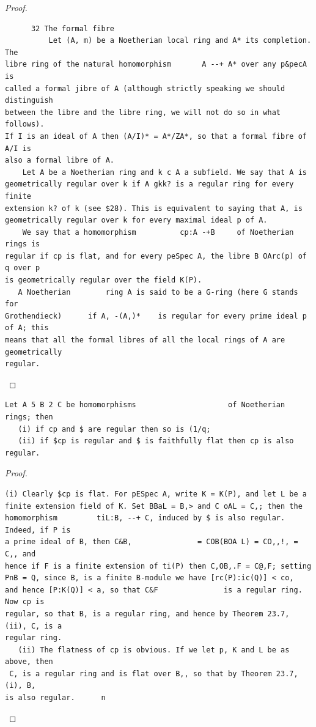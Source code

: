 \begin{proof}
\begin{verbatim}
      32 The formal fibre
          Let (A, m) be a Noetherian local ring and A* its completion. The
libre ring of the natural homomorphism       A --+ A* over any p&pecA is
called a formal jibre of A (although strictly speaking we should distinguish
between the libre and the libre ring, we will not do so in what follows).
If I is an ideal of A then (A/I)* = A*/ZA*, so that a formal fibre of A/I is
also a formal libre of A.
    Let A be a Noetherian ring and k c A a subfield. We say that A is
geometrically regular over k if A gkk? is a regular ring for every finite
extension k? of k (see $28). This is equivalent to saying that A, is
geometrically regular over k for every maximal ideal p of A.
    We say that a homomorphism          cp:A -+B     of Noetherian    rings is
regular if cp is flat, and for every peSpec A, the libre B OArc(p) of q over p
is geometrically regular over the field K(P).
   A Noetherian        ring A is said to be a G-ring (here G stands for
Grothendieck)      if A, -(A,)*    is regular for every prime ideal p of A; this
means that all the formal libres of all the local rings of A are geometrically
regular.
\end{verbatim}
\end{proof}


\begin{theorem}\label{mcrt-auto-theorem-32-1}\uses{}
\begin{verbatim}
Let A 5 B 2 C be homomorphisms                     of Noetherian
rings; then
   (i) if cp and $ are regular then so is (1/q;
   (ii) if $cp is regular and $ is faithfully flat then cp is also regular.
\end{verbatim}
\end{theorem}
\begin{proof}
\begin{verbatim}
(i) Clearly $cp is flat. For pESpec A, write K = K(P), and let L be a
finite extension field of K. Set BBaL = B,> and C oAL = C,; then the
homomorphism         tiL:B, --+ C, induced by $ is also regular. Indeed, if P is
a prime ideal of B, then C&B,               = COB(BOA L) = CO,,!, = C,, and
hence if F is a finite extension of ti(P) then C,OB,.F = C@,F; setting
PnB = Q, since B, is a finite B-module we have [rc(P):ic(Q)] < co,
and hence [P:K(Q)] < a, so that C&F               is a regular ring. Now cp is
regular, so that B, is a regular ring, and hence by Theorem 23.7, (ii), C, is a
regular ring.
   (ii) The flatness of cp is obvious. If we let p, K and L be as above, then
 C, is a regular ring and is flat over B,, so that by Theorem 23.7, (i), B,
is also regular.      n
\end{verbatim}
\end{proof}



